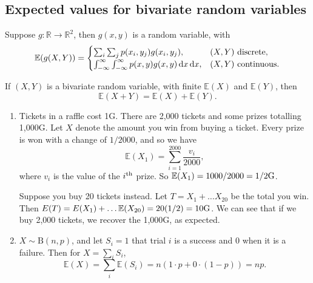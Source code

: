 \documentclass[letter-paper]{tufte-book}
\newenvironment{example}[1][Example]{\begin{trivlist}
\item[\hskip \labelsep {\bfseries #1}]}{\end{trivlist}}
\begin{document}

\subsection{Expected values for bivariate random variables}

Suppose $g:\mathbb{R}\to\mathbb{R}^2$, then $g(x,y)$ is a random variable, with
\begin{equation*}
  \mathbb{E}(g(X,Y)) =
    \begin{cases}
      \sum_i \sum_j p(x_i, y_j) g(x_i, y_j), & (X,Y)\ \textnormal{discrete},\\
      \int_{-\infty}^\infty \int_{-\infty}^\infty
        p(x,y) g(x,y)\, \mathrm{d}x\,\mathrm{d}x, & 
        (X,Y)\ \textnormal{continuous}.
    \end{cases}
\end{equation*}

If $(X,Y)$ is a bivariate random variable, with finite $\mathbb{E}(X)$ and
$\mathbb{E}(Y)$, then
\begin{equation*}
  \mathbb{E}(X + Y) = \mathbb{E}(X) + \mathbb{E}(Y).
\end{equation*}

\begin{example}
  \begin{enumerate}
    \item Tickets in a raffle cost 1G. There are 2,000 tickets and some prizes
    totalling 1,000G. Let $X$ denote the amount you win from buying a ticket.
    Every prize is won with a change of $1/2000$, and so we have
    \begin{equation*}
      \mathbb{E}(X_1) = \sum_{i=1}^{2000} \frac{v_i}{2000},
    \end{equation*}
    where $v_i$ is the value of the $i^{\textnormal{th}}$ prize. So
    $\mathbb{E}(X_1) = 1000/2000 = 1/2\textnormal{G}$.
    
    Suppose you buy 20 tickets instead. Let $T = X_1 + \ldots X_{20}$ be the
    total you win. Then $E(T) = E(X_1) + \ldots \mathbb{E}(X_{20}) = 20(1/2) =
    10\textnormal{G}$. We can see that if we buy 2,000 tickets, we recover the
    1,000G, as expected.
    
    \item $X\sim\mbox{B}(n,p)$, and let $S_i = 1$ that trial $i$ is a success
    and $0$ when it is a failure. Then for $X = \sum_i S_i$,
    \begin{equation*}
      \mathbb{E}(X) = \sum_i \mathbb{E}(S_i) = n(1\cdot p + 0\cdot(1-p)) = np.
    \end{equation*}
  \end{enumerate}
\end{example}
\end{document}
